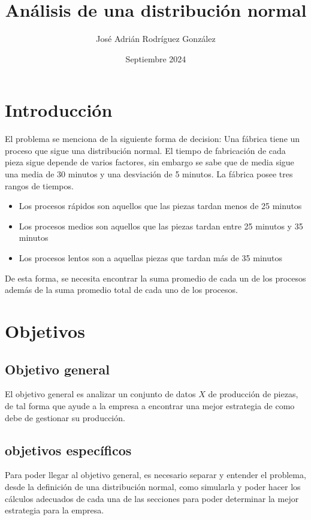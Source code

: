 \documentclass{article}
\title{Análisis de una distribución normal}
\author{José Adrián Rodríguez González }
\date{Septiembre 2024}
\begin{document}
\maketitle

\section{Introducción}
El problema se menciona de la siguiente forma de decision:
Una fábrica tiene un proceso que sigue una distribución normal. El tiempo de fabricación de cada pieza sigue depende de varios factores, sin embargo se sabe que de media sigue una media de 30 minutos y una desviación de 5 minutos.
La fábrica posee tres rangos de tiempos.
\begin{itemize}
    \item Los procesos rápidos son aquellos que las piezas tardan menos de 25 minutos
    \item Los procesos medios son aquellos que las piezas tardan entre 25 minutos y 35 minutos
    \item Los procesos lentos son a aquellas piezas que tardan más de 35 minutos
\end{itemize}
De esta forma, se necesita encontrar la suma promedio de cada un de los procesos además de la suma promedio total de cada uno de los procesos.

\section{Objetivos}
\subsection{Objetivo general}
El objetivo general es analizar un conjunto de datos $X$ de producción de piezas, de tal forma que ayude a la empresa a encontrar una mejor estrategia de como debe de gestionar su producción.
\subsection{objetivos específicos}
Para poder llegar al objetivo general, es necesario separar y entender el problema, desde la definición de una distribución normal, como simularla y poder hacer los cálculos adecuados de cada una de las secciones para poder determinar la mejor estrategia para la empresa. 
\end{document}
